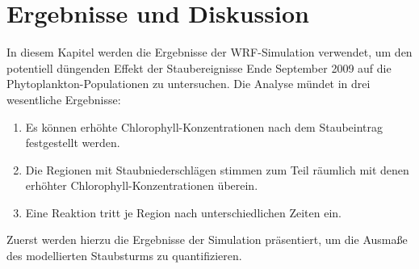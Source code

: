 \documentclass[12pt,a4paper,onecolumn]{scrartcl}
\begin{document}
\section{Ergebnisse und Diskussion} \label{sec:auswertung}
In diesem Kapitel werden die Ergebnisse der WRF-Simulation verwendet, um den potentiell düngenden Effekt der Staubereignisse Ende September 2009 auf die Phytoplankton-Populationen zu untersuchen. Die Analyse mündet in drei wesentliche Ergebnisse:
\begin{enumerate}
\item Es können erhöhte Chlorophyll-Konzentrationen nach dem Staubeintrag festgestellt werden.
\item Die Regionen mit Staubniederschlägen stimmen zum Teil räumlich mit denen erhöhter Chlorophyll-Konzentrationen überein.
\item Eine Reaktion tritt je Region nach unterschiedlichen Zeiten ein.
\end{enumerate}
Zuerst werden hierzu die Ergebnisse der Simulation präsentiert, um die Ausmaße des modellierten Staubsturms zu quantifizieren. 
\end{document}
